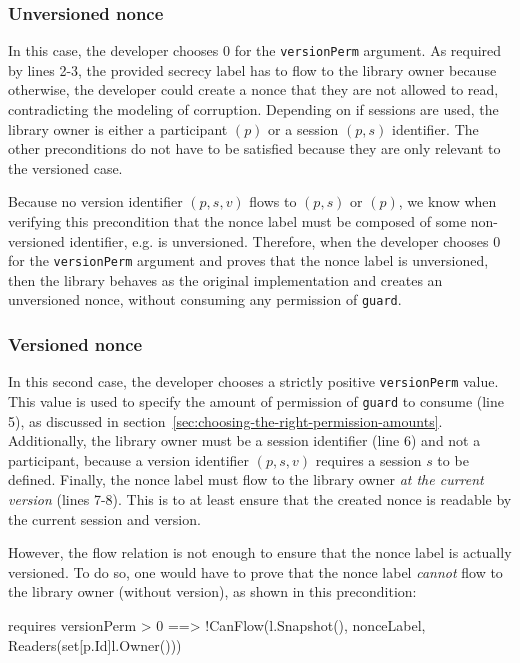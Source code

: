 \subsubsection{Unversioned nonce}
\label{sec:unversioned-nonce}

In this case, the developer chooses $0$ for the \texttt{versionPerm} argument.
As required by lines 2-3, the provided secrecy label has to flow to the library owner because otherwise, the developer could create a nonce that they are not allowed to read, contradicting the modeling of corruption.
Depending on if sessions are used, the library owner is either a participant $(p)$ or a session $(p,s)$ identifier.
The other preconditions do not have to be satisfied because they are only relevant to the versioned case.

Because no version identifier $(p,s,v)$ flows to $(p,s)$ or $(p)$, we know when verifying this precondition that the nonce label must be composed of some non-versioned identifier, e.g. is unversioned.
Therefore, when the developer chooses $0$ for the \texttt{versionPerm} argument and proves that the nonce label is unversioned, then the library behaves as the original implementation and creates an unversioned nonce, without consuming any permission of \texttt{guard}.

\subsubsection{Versioned nonce}
\label{sec:versioned-nonce}

In this second case, the developer chooses a strictly positive \texttt{versionPerm} value.
This value is used to specify the amount of permission of \texttt{guard} to consume (line 5), as discussed in section~\ref{sec:choosing-the-right-permission-amounts}.
Additionally, the library owner must be a session identifier (line 6) and not a participant, because a version identifier $(p,s,v)$ requires a session $s$ to be defined.
Finally, the nonce label must flow to the library owner \emph{at the current version} (lines 7-8).
This is to at least ensure that the created nonce is readable by the current session and version.

However, the flow relation is not enough to ensure that the nonce label is actually versioned. To do so, one would have to prove that the nonce label \emph{cannot} flow to the library owner (without version), as shown in this precondition:

\begin{gobra}
requires versionPerm > 0 ==>
    !CanFlow(l.Snapshot(), nonceLabel, Readers(set[p.Id]{l.Owner()}))
\end{gobra}

